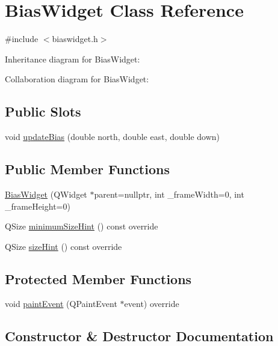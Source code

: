 \hypertarget{class_bias_widget}{}\section{Bias\+Widget Class Reference}
\label{class_bias_widget}


{\ttfamily \#include $<$biaswidget.\+h$>$}



Inheritance diagram for Bias\+Widget\+:


Collaboration diagram for Bias\+Widget\+:
\subsection*{Public Slots}
\begin{DoxyCompactItemize}
\item 
void \mbox{\hyperlink{class_bias_widget_a9f3ae503fe3d5f4096c3cd0cdbd9c59a}{update\+Bias}} (double north, double east, double down)
\end{DoxyCompactItemize}
\subsection*{Public Member Functions}
\begin{DoxyCompactItemize}
\item 
\mbox{\hyperlink{class_bias_widget_a4ecfcf8875a2fd859ef51c663a4e0be6}{Bias\+Widget}} (Q\+Widget $\ast$parent=nullptr, int \+\_\+frame\+Width=0, int \+\_\+frame\+Height=0)
\item 
Q\+Size \mbox{\hyperlink{class_bias_widget_a056c7fb68421608c0f163eedad8f3ef1}{minimum\+Size\+Hint}} () const override
\item 
Q\+Size \mbox{\hyperlink{class_bias_widget_a353177d26630c385017fabf8fb517e75}{size\+Hint}} () const override
\end{DoxyCompactItemize}
\subsection*{Protected Member Functions}
\begin{DoxyCompactItemize}
\item 
void \mbox{\hyperlink{class_bias_widget_a59937e37b7ba432d0f344f6b211e28af}{paint\+Event}} (Q\+Paint\+Event $\ast$event) override
\end{DoxyCompactItemize}


\subsection{Constructor \& Destructor Documentation}
\mbox{\label{class_bias_widget_a4ecfcf8875a2fd859ef51c663a4e0be6}} 
